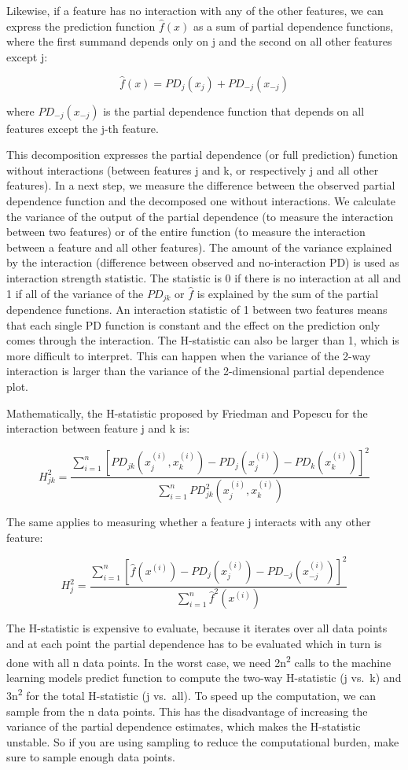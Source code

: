 \documentclass[
  11pt,
]{scrbook}
\begin{document}
Likewise, if a feature has no interaction with any of the other features, we can express the prediction function \(\hat{f}(x)\) as a sum of partial dependence functions, where the first summand depends only on j and the second on all other features except j:

\[\hat{f}(x)=PD_j(x_j)+PD_{-j}(x_{-j})\]

where \(PD_{-j}(x_{-j})\) is the partial dependence function that depends on all features except the j-th feature.

This decomposition expresses the partial dependence (or full prediction) function without interactions (between features j and k, or respectively j and all other features).
In a next step, we measure the difference between the observed partial dependence function and the decomposed one without interactions.
We calculate the variance of the output of the partial dependence (to measure the interaction between two features) or of the entire function (to measure the interaction between a feature and all other features).
The amount of the variance explained by the interaction (difference between observed and no-interaction PD) is used as interaction strength statistic.
The statistic is 0 if there is no interaction at all and 1 if all of the variance of the \(PD_{jk}\) or \(\hat{f}\) is explained by the sum of the partial dependence functions.
An interaction statistic of 1 between two features means that each single PD function is constant and the effect on the prediction only comes through the interaction.
The H-statistic can also be larger than 1, which is more difficult to interpret.
This can happen when the variance of the 2-way interaction is larger than the variance of the 2-dimensional partial dependence plot.

Mathematically, the H-statistic proposed by Friedman and Popescu for the interaction between feature j and k is:

\[H^2_{jk} = \frac{\sum_{i=1}^n\left[PD_{jk}(x_{j}^{(i)},x_k^{(i)})-PD_j(x_j^{(i)}) - PD_k(x_{k}^{(i)})\right]^2}{\sum_{i=1}^n{PD}^2_{jk}(x_j^{(i)},x_k^{(i)})}\]

The same applies to measuring whether a feature j interacts with any other feature:

\[H^2_{j}=\frac{\sum_{i=1}^n\left[\hat{f}(x^{(i)})-PD_j(x_j^{(i)})-PD_{-j}(x_{-j}^{(i)})\right]^2}{\sum_{i=1}^n\hat{f}^2(x^{(i)})}\]

The H-statistic is expensive to evaluate, because it iterates over all data points and at each point the partial dependence has to be evaluated which in turn is done with all n data points.
In the worst case, we need 2n\textsuperscript{2} calls to the machine learning models predict function to compute the two-way H-statistic (j vs.~k) and 3n\textsuperscript{2} for the total H-statistic (j vs.~all).
To speed up the computation, we can sample from the n data points.
This has the disadvantage of increasing the variance of the partial dependence estimates, which makes the H-statistic unstable.
So if you are using sampling to reduce the computational burden, make sure to sample enough data points.
\end{document}
